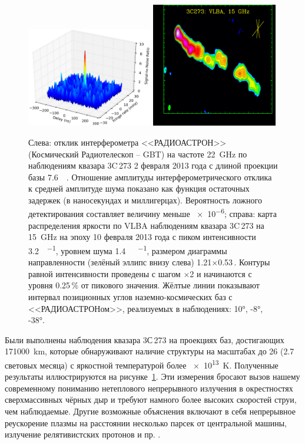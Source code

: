 \begin{figure}[tbh]
\centering
\includegraphics[width=0.49\textwidth]{vNPO2016_3c273_fringe.jpg}
\includegraphics[width=0.49\textwidth]{vNPO2016_3c273_VLBA.jpg}

\caption{Слева: отклик интерферометра <<РАДИОАСТРОН>> (Космический Радиотелескоп -- GBT) на частоте
\SI{22}{\GHz} по наблюдениям квазара 3C\,273 2 февраля 2013 года с длиной проекции базы
\SI{7.6}{\giga\la}. Отношение амплитуды интерферометрического отклика к средней амплитуде шума
показано как функция остаточных задержек (в наносекундах и миллигерцах). Вероятность ложного
детектирования составляет величину меньше \num{e-6}; справа: карта распределения яркости по VLBA
наблюдениям квазара 3C\,273 на \SI{15}{\GHz} на эпоху 10 февраля 2013 года с пиком интенсивности
\SI{3.2}{\jansky\per\beam}, уровнем шума \SI{1.4}{\milli\jansky\per\beam}, размером диаграммы
направленности (зелёный эллипс внизу слева) 1.21$\times$0.53\,\si{\mas}. Контуры равной
интенсивности проведены с шагом $\times$2 и начинаются с уровня 0.25\,\% от пикового значения.
Жёлтые линии показывают интервал позиционных углов наземно-космических баз с <<РАДИОАСТРОНом>>,
реализуемых в наблюдениях: \ang{10}, \ang{-8}, \ang{-38}. }
\label{fig:vnpo2016_3c273}
\end{figure}

Были выполнены наблюдения квазара 3С\,273 на проекциях баз, достигающих \SI{171000}{\km}, которые
обнаруживают наличие структуры на масштабах до \SI{26}{\uas} (2.7 световых месяца) с яркостной
температурой более \SI{e13}{\kelvin}. Полученные результаты иллюстрируются на
рисунке~\ref{fig:vnpo2016_3c273}. Эти измерения бросают вызов нашему современному пониманию
нетеплового непрерывного излучения в окрестностях сверхмассивных чёрных дыр и требуют намного более
высоких скоростей струи, чем наблюдаемые. Другие возможные объяснения включают в себя непрерывное
реускорение плазмы на расстоянии несколько парсек от центральной машины, излучение релятивистских
протонов и пр. \cite{Kovalev_2016}.


